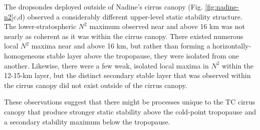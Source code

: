 The dropsondes deployed outside of Nadine's cirrus canopy (Fig. \ref{fig:nadine-n2}c,d) observed a considerably different upper-level static stability structure.
The lower-stratospheric $N^2$ maximum observed near and above 16 km was not nearly as coherent as it was within the cirrus canopy.
There existed numerous local $N^2$ maxima near and above 16 km, but rather than forming a horizontally-homogeneous stable layer above the tropopause, they were isolated from one another.
Likewise, there were a few weak, isolated local maxima in $N^2$ within the 12-15-km layer, but the distinct secondary stable layer that was observed within the cirrus canopy did not exist outside of the cirrus canopy.

These observations suggest that there might be processes unique to the TC cirrus canopy that produce stronger static stability above the cold-point tropopause and a secondary stability maximum below the tropopause.

